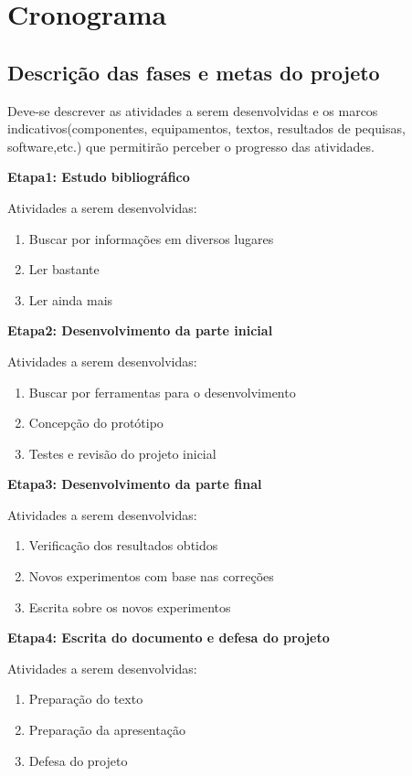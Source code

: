 \newpage
\section{Cronograma}
\label{sc:cronograma}

\subsection{Descrição das fases e metas do projeto}

Deve-se descrever as atividades a serem desenvolvidas e os marcos indicativos(componentes, equipamentos, textos, resultados de pequisas, software,etc.) que permitirão perceber o progresso das atividades.

\textbf{Etapa1: Estudo bibliográfico}

Atividades a serem desenvolvidas:
\begin{enumerate}[label=\textbf{1.\arabic*}]
\item \label{b1} Buscar por informações em diversos lugares
\item \label{b2}  Ler bastante 
\item \label{b3} Ler ainda mais
\end{enumerate}

\textbf{Etapa2: Desenvolvimento da parte inicial}

Atividades a serem desenvolvidas:
\begin{enumerate} [label=\textbf{2.\arabic*}]
\item \label{dev1} Buscar por ferramentas para o desenvolvimento
\item \label{dev2} Concepção do protótipo
\item \label{dev3} Testes e revisão do projeto inicial
\end{enumerate}

\textbf{Etapa3: Desenvolvimento da parte final}

Atividades a serem desenvolvidas:
\begin{enumerate}[label=\textbf{3.\arabic*}]
\item \label{dev4} Verificação dos resultados obtidos
\item \label{dev5} Novos experimentos com base nas correções
\item \label{dev6} Escrita sobre os novos experimentos
\end{enumerate}

\textbf{Etapa4: Escrita do documento e defesa do projeto}

Atividades a serem desenvolvidas:
\begin{enumerate}[label=\textbf{4.\arabic*}]
\item \label{doc1} Preparação do texto
\item \label{doc2} Preparação da apresentação
\item \label{doc3} Defesa do projeto
\end{enumerate}

